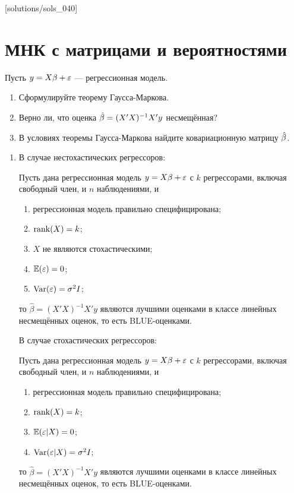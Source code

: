 [solutions/sols_040]

\chapter{МНК с матрицами и вероятностями}


\begin{problem}
Пусть $y = X\beta + \varepsilon$ — регрессионная модель.
\begin{enumerate}
\item Сформулируйте теорему Гаусса-Маркова.
\item Верно ли, что оценка $\hat{\beta} = (X'X)^{-1}X'y$ несмещённая?
\item В условиях теоремы Гаусса-Маркова найдите ковариационную матрицу $\hat{\beta}$.
\end{enumerate}


\begin{sol}
\begin{enumerate}
\item
В случае нестохастических регрессоров:

Пусть дана регрессионная модель $y=X\beta+\varepsilon$ с $k$ регрессорами, включая свободный член, и $n$ наблюдениями, и
\begin{enumerate}
\item регрессионная модель правильно специфицирована;
\item $\operatorname{rank}(X)=k$;
\item $X$ не являются стохастическими;
\item $\mathbb{E}(\varepsilon)=0$;
\item $\operatorname{Var}(\varepsilon)=\sigma^2 I$;
\end{enumerate}
то $\hat\beta=(X'X)^{-1}X'y$ являются лучшими оценками в классе линейных несмещённых оценок, то есть BLUE-оценками.

В случае стохастических регрессоров:

Пусть дана регрессионная модель $y=X\beta+\varepsilon$ с $k$ регрессорами, включая свободный член, и $n$ наблюдениями, и
\begin{enumerate}
\item регрессионная модель правильно специфицирована;
\item $\operatorname{rank}(X)=k$;
\item $\mathbb{E}(\varepsilon|X)=0$;
\item $\operatorname{Var}(\varepsilon|X)=\sigma^2 I$;
\end{enumerate}
то $\hat\beta=(X'X)^{-1}X'y$ являются лучшими оценками в классе линейных несмещённых оценок, то есть BLUE-оценками.


\end{enumerate}
\end{sol}
\end{problem}
